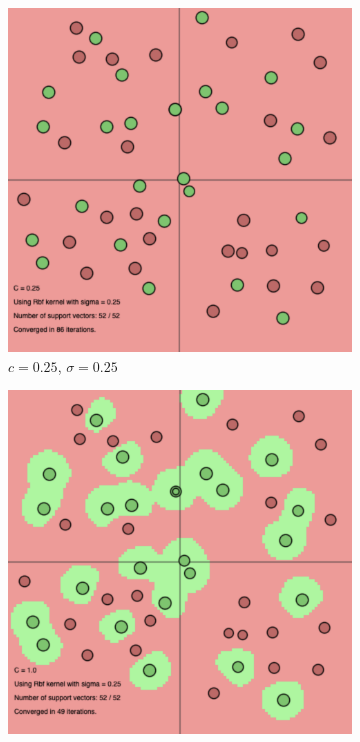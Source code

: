 \documentclass[a4paper, 11pt, one column]{article}
\begin{document}
\begin{figure}
\begin{subfigure}{0.3\textwidth}
   \includegraphics[width=\linewidth]{images/rbf_c_0.25_s_0.25.png}
   \caption{$c=0.25$, $\sigma=0.25$} \label{fig:x_a}
\end{subfigure}
\hspace*{\fill}
\begin{subfigure}{0.3\textwidth}
   \includegraphics[width=\linewidth]{images/rbf_c_1_s_0.25.png}

\end{subfigure}
\end{figure}
\end{document}
